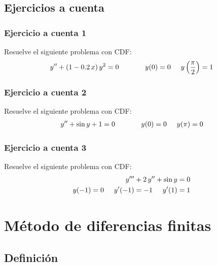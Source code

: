 \documentclass[12pt]{beamer}
\begin{document}
\subsection{Ejercicios a cuenta}

\begin{frame}
\frametitle{Ejercicio a cuenta 1}
Resuelve el siguiente problema con CDF:
\begin{align*}
{y}^{\prime \prime} + (1 - 0.2 \, x) \, y^{2} = 0 \hspace{1.3cm} y (0) = 0 \hspace{0.5cm} y \left( \dfrac{\pi}{2} \right) = 1
\end{align*}
\end{frame}
\begin{frame}
\frametitle{Ejercicio a cuenta 2}
Resuelve el siguiente problema con CDF:
\begin{align*}
{y}^{\prime \prime} + \sin y + 1 = 0 \hspace{1.3cm} y (0) = 0 \hspace{0.5cm} y (\pi) = 0
\end{align*}
\end{frame}
\begin{frame}
\frametitle{Ejercicio a cuenta 3}
Resuelve el siguiente problema con CDF:
\begin{align*}
{y}^{\prime \prime \prime} + 2 \, {y}^{\prime \prime} + \sin y = 0 \\
y (-1) = 0 \hspace{0.5cm} {y}^{\prime} (-1) = -1 \hspace{0.5cm} {y}^{\prime} (1) = 1
\end{align*}
\end{frame}

\section{Método de diferencias finitas}
\subsection{Definición}
\end{document}
